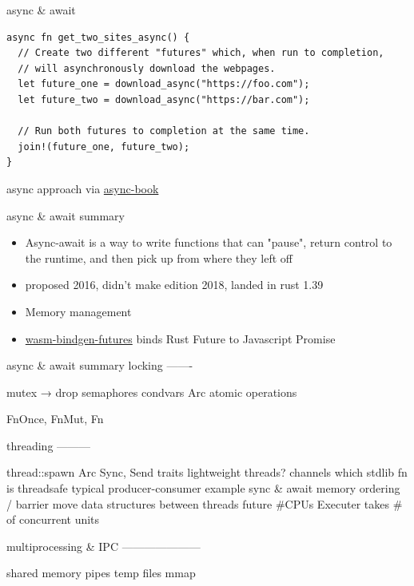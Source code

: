 \documentclass{beamer}
\begin{document}
\begin{frame}[fragile]{async \& await}
  \begin{verbatim}
async fn get_two_sites_async() {
  // Create two different "futures" which, when run to completion,
  // will asynchronously download the webpages.
  let future_one = download_async("https://foo.com");
  let future_two = download_async("https://bar.com");

  // Run both futures to completion at the same time.
  join!(future_one, future_two);
}
  \end{verbatim}
  async approach via \href{https://rust-lang.github.io/async-book/01_getting_started/02_why_async.html}{async-book}
\end{frame}

\begin{frame}[fragile]{async \& await summary}
  \begin{itemize}
    \item Async-await is a way to write functions that can "pause", return control to the runtime, and then pick up from where they left off
    \item proposed 2016, didn't make edition 2018, landed in rust 1.39
    \item Memory management
    \item \href{https://docs.rs/crate/wasm-bindgen-futures/0.4.17}{wasm-bindgen-futures} binds Rust Future to Javascript Promise
  \end{itemize}
\end{frame}











\begin{frame}[fragile]{async \& await summary}
locking
-------

mutex → drop
semaphores
condvars
Arc
atomic operations

{FnOnce, FnMut, Fn}

threading
---------

thread::spawn
Arc
Sync, Send traits
lightweight threads?
channels
which stdlib fn is threadsafe
typical producer-consumer example
sync \& await
memory ordering / barrier
move data structures between threads
future
\#CPUs
Executer takes \# of concurrent units

multiprocessing \& IPC
---------------------

shared memory
pipes
temp files
mmap
\end{frame}
\end{document}
